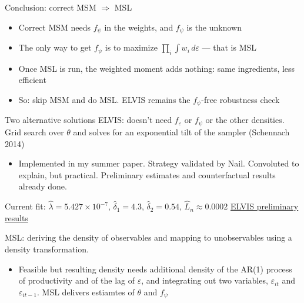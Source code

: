 \documentclass[
  ignorenonframetext,
  aspectratio=169,
]{beamer}
\providecommand{\tightlist}{%
  \setlength{\itemsep}{0pt}\setlength{\parskip}{0pt}}
\newcommand{\sm}[1]{\textcolor{gray}{\footnotesize #1}} %
\begin{document}
\begin{frame}{Conclusion: correct MSM \(\Rightarrow\) MSL}
\protect{}\label{conclusion-correct-msm-rightarrow-msl}
\begin{itemize}
\tightlist
\item
  Correct MSM needs \(f_\psi\) in the weights, and \(f_\psi\) is the
  unknown
\item
  The only way to get \(f_\psi\) is to maximize
  \(\prod_i\int w_i\,d\varepsilon\) --- that is MSL
\item
  Once MSL is run, the weighted moment adds nothing: same ingredients,
  less efficient
\item
  So: skip MSM and do MSL. ELVIS remains the \(f_\psi\)-free robustness
  check
\end{itemize}
\end{frame}

\begin{frame}{Two alternative solutions}
\protect{}\label{two-alternative-solutions}
ELVIS: doesn't need \(f_\varepsilon\) or \(f_\psi\) or the other
densities. Grid search over \(\theta\) and solves for an exponential
tilt of the sampler (Schennach 2014)

\begin{itemize}
\tightlist
\item
  Implemented in my summer paper. Strategy validated by Nail. Convoluted
  to explain, but practical. Preliminary estimates and counterfactual
  results already done.
\end{itemize}

Current fit: \(\hat\lambda=5.427\times10^{-7}\), \(\hat\delta_1=4.3\),
\(\hat\delta_2=0.54\), \(\hat L_n\approx0.0002\)
\sm{\hyperlink{sec-elvis-res}{ELVIS preliminary results}}

MSL: deriving the density of observables and mapping to unobservables
using a density transformation.

\begin{itemize}
\tightlist
\item
  Feasible but resulting density needs additional density of the AR(1)
  process of productivity and of the lag of \(\varepsilon\), and
  integrating out two variables, \(\varepsilon_{it}\) and
  \(\varepsilon_{it-1}\). MSL delivers estiamtes of \(\theta\) and
  \(f_\psi\)
\end{itemize}
\end{frame}
\end{document}
